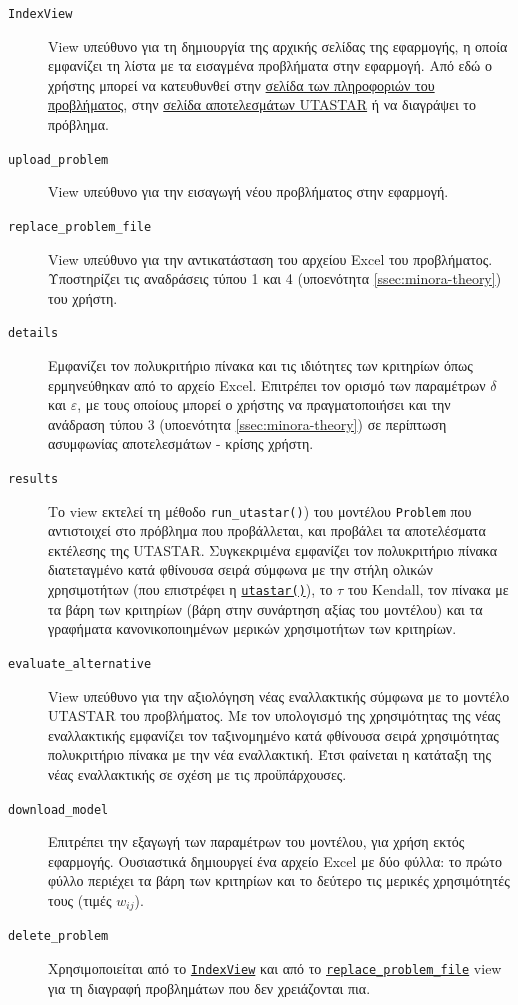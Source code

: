 \documentclass[11pt,a4paper,titlepage]{article}
\numberwithin{equation}{section}
\begin{document}
\begin{description}
\item[\hypertarget{IndexView}{\texttt{IndexView}}] View υπεύθυνο για τη δημιουργία της αρχικής σελίδας της εφαρμογής, η 
οποία εμφανίζει τη λίστα με τα εισαγμένα προβλήματα στην εφαρμογή. Από εδώ ο χρήστης μπορεί να
κατευθυνθεί στην \hyperlink{details}{σελίδα των πληροφοριών του προβλήματος}, στην \hyperlink{results}{σελίδα αποτελεσμάτων UTASTAR} ή να διαγράψει το πρόβλημα.
\item[\hypertarget{uploadproblem}{\texttt{upload\_problem}}] View υπεύθυνο για την εισαγωγή νέου προβλήματος στην εφαρμογή.
\item[\hypertarget{replaceproblemfile}{\texttt{replace\_problem\_file}}] View υπεύθυνο για την αντικατάσταση του αρχείου Excel του προβλήματος. Υποστηρίζει τις αναδράσεις τύπου 1 και 4 (υποενότητα \ref{ssec:minora-theory}) του χρήστη.
\item[\hypertarget{details}{\texttt{details}}] Εμφανίζει τον πολυκριτήριο πίνακα και τις ιδιότητες των κριτηρίων όπως ερμηνεύθηκαν από το αρχείο Excel. Επιτρέπει τον ορισμό των παραμέτρων $ \delta $ και $ \varepsilon $, με τους οποίους μπορεί ο χρήστης να πραγματοποιήσει και την ανάδραση τύπου 3 (υποενότητα \ref{ssec:minora-theory}) σε περίπτωση ασυμφωνίας αποτελεσμάτων - κρίσης χρήστη.
\item[\hypertarget{results}{\texttt{results}}] Το view εκτελεί τη μέθοδο \texttt{run\_utastar()}) του μοντέλου \texttt{Problem} που αντιστοιχεί στο πρόβλημα που προβάλλεται, και προβάλει τα αποτελέσματα εκτέλεσης της UTASTAR. Συγκεκριμένα εμφανίζει τον πολυκριτήριο πίνακα διατεταγμένο κατά φθίνουσα σειρά σύμφωνα με την στήλη ολικών χρησιμοτήτων (που επιστρέφει η \hyperref[sssec:utastar()]{\texttt{utastar()}}), το $ \tau $ του Kendall, τον πίνακα με τα βάρη των κριτηρίων (βάρη στην συνάρτηση αξίας του μοντέλου) και τα γραφήματα κανονικοποιημένων μερικών χρησιμοτήτων των κριτηρίων.
\item[\hypertarget{evaluatealternative}{\texttt{evaluate\_alternative}}] View υπεύθυνο για την αξιολόγηση νέας εναλλακτικής σύμφωνα με το μοντέλο UTASTAR του προβλήματος. Με τον υπολογισμό της χρησιμότητας της νέας εναλλακτικής εμφανίζει τον ταξινομημένο κατά φθίνουσα σειρά χρησιμότητας πολυκριτήριο πίνακα με την νέα εναλλακτική. Έτσι φαίνεται η κατάταξη της νέας εναλλακτικής σε σχέση με τις προϋπάρχουσες.
\item[\hypertarget{downloadmodel}{\texttt{download\_model}}] Επιτρέπει την εξαγωγή των παραμέτρων του μοντέλου, για χρήση εκτός εφαρμογής. Ουσιαστικά δημιουργεί ένα αρχείο Excel με δύο φύλλα: το πρώτο φύλλο περιέχει τα βάρη των κριτηρίων και το δεύτερο τις μερικές χρησιμότητές τους (τιμές $ w_{ij} $).
\item[\hypertarget{deleteproblem}{\texttt{delete\_problem}}] Χρησιμοποιείται από το \hyperlink{IndexView}{\texttt{IndexView}} και από το \hyperlink{replaceproblemfile}{\texttt{replace\_problem\_file}} view για τη διαγραφή προβλημάτων που δεν χρειάζονται πια.
\end{description}
\end{document}
